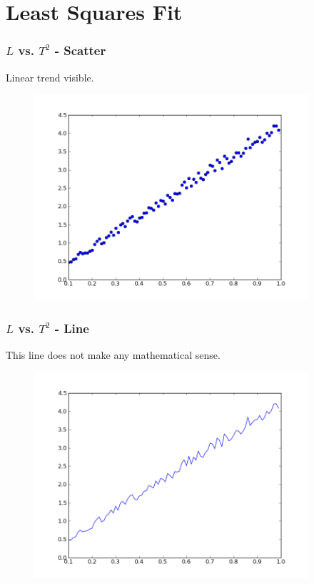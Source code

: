 \documentclass[14pt,compress]{beamer}
\begin{document}
\section{Least Squares Fit}
\begin{frame}[fragile]
\frametitle{$L$ vs. $T^2$ - Scatter}
Linear trend visible.
\vspace{-0.1in}
\begin{figure}
\includegraphics[width=4in]{data/L-Tsq-points}
\end{figure}
\end{frame}

\begin{frame}[fragile]
\frametitle{$L$ vs. $T^2$ - Line}
This line does not make any mathematical sense.
\vspace{-0.1in}
\begin{figure}
\includegraphics[width=4in]{data/L-Tsq-Line}
\end{figure}
\end{frame}
\end{document}
